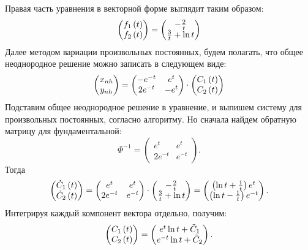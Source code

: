 		Правая часть уравнения в векторной форме выглядит таким образом:
		\[ \begin{pmatrix} f_1 \left( t \right) \\ f_2 \left( t \right) \end{pmatrix} = \begin{pmatrix} - \frac{2}{t} \\ \frac{3}{t} + \ln{t} \end{pmatrix} \]
		Далее методом вариации произвольных постоянных, будем полагать, что общее неоднородное решение можно записать в следующем виде:
		\[ \begin{pmatrix} x_{nh} \\ y_{nh} \end{pmatrix} = \begin{pmatrix} -e^{-t} & e^{t} \\ 2e^{-t} & -e^{t} \end{pmatrix} \cdot \begin{pmatrix} C_1 \left( t \right) \\ C_2 \left( t \right) \end{pmatrix} \]
		Подставим общее неоднородное решение в уравнение, и выпишем систему для произвольных постоянных, согласно алгоритму. Но сначала найдем обратную матрицу для фундаментальной:
		\[ \Phi^{-1} = \begin{pmatrix} e^{t} & e^{t} \\ 2e^{-t} & e^{-t} \end{pmatrix}. \]
		Тогда
		\[ \begin{pmatrix} \dot{C}_1 \left( t \right) \\ \dot{C}_2 \left( t \right) \end{pmatrix} = \begin{pmatrix} e^{t} & e^{t} \\ 2e^{-t} & e^{-t} \end{pmatrix} \cdot \begin{pmatrix} - \frac{2}{t} \\ \frac{3}{t} + \ln{t} \end{pmatrix} = \begin{pmatrix} \left( \ln{t} + \frac{1}{t} \right) e^{t} \\ \left( \ln{t} - \frac{1}{t} \right)e^{-t} \end{pmatrix}. \]
		Интегрируя каждый компонент вектора отдельно, получим:
		\[ \begin{pmatrix} C_1 \left( t \right) \\ C_2 \left( t \right) \end{pmatrix} = \begin{pmatrix} e^{t} \ln{t} + \tilde{C}_1 \\ e^{-t} \ln{t} + \tilde{C}_2 \end{pmatrix}. \]
